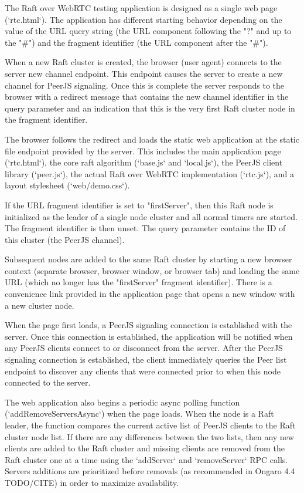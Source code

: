 \documentclass{acmtog} %
\begin{document}
The Raft over WebRTC testing application is designed as a single web
page (`rtc.html`). The application has different starting behavior
depending on the value of the URL query string (the URL component
following the "?" and up to the "\#") and the fragment identifier (the
URL component after the "\#").

When a new Raft cluster is created, the browser (user agent) connects
to the server new channel endpoint. This endpoint causes the server to
create a new channel for PeerJS signaling. Once this is complete the
server responds to the browser with a redirect message that contains
the new channel identifier in the query parameter and an indication
that this is the very first Raft cluster node in the fragment
identifier.

The browser follows the redirect and loads the static web application
at the static file endpoint provided by the server. This includes the
main application page (`rtc.html`), the core raft algorithm
(`base.js` and `local.js`), the PeerJS client library (`peer.js`), the
actual Raft over WebRTC implementation (`rtc.js`), and a layout
stylesheet (`web/demo.css`).

If the URL fragment identifier is set to "firstServer", then this Raft
node is initialized as the leader of a single node cluster and all
normal timers are started. The fragment identifier is then unset. The
query parameter contains the ID of this cluster (the PeerJS channel).

Subsequent nodes are added to the same Raft cluster by starting a new
browser context (separate browser, browser window, or browser tab) and
loading the same URL (which no longer has the "firstServer" fragment
identifier). There is a convenience link provided in the application
page that opens a new window with a new cluster node.

When the page first loads, a PeerJS signaling connection is
established with the server. Once this connection is established, the
application will be notified when any PeerJS clients connect to or
disconnect from the server. After the PeerJS signaling connection is
established, the client immediately queries the Peer list endpoint to
discover any clients that were connected prior to when this node
connected to the server.

The web application also begins a periodic async polling function
(`addRemoveServersAsync`) when the page loads. When the node is a Raft
leader, the function compares the current active list of PeerJS clients to
the Raft cluster node list. If there are any differences between the
two lists, then any new clients are added to the Raft cluster and
missing clients are removed from the Raft cluster one at a time using
the `addServer` and `removeServer` RPC calls. Servers additions are
prioritized before removals (as recommended in Ongaro 4.4 TODO/CITE)
in order to maximize availability.
\end{document}

